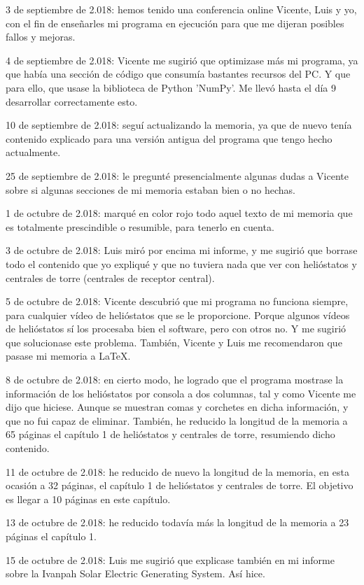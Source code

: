 \documentclass[12pt]{article}
\begin{document}
3 de septiembre de 2.018: hemos tenido una conferencia online Vicente, Luis y yo, con el fin de enseñarles mi programa en ejecución para que me dijeran posibles fallos y mejoras.

4 de septiembre de 2.018: Vicente me sugirió que optimizase más mi programa, ya que había una sección de código que consumía bastantes recursos del PC. Y que para ello, que usase la biblioteca de Python 'NumPy'. Me llevó hasta el día 9 desarrollar correctamente esto.

10 de septiembre de 2.018: seguí actualizando la memoria, ya que de nuevo tenía contenido explicado para una versión antigua del programa que tengo hecho actualmente.

25 de septiembre de 2.018: le pregunté presencialmente algunas dudas a Vicente sobre si algunas secciones de mi memoria estaban bien o no hechas.

1 de octubre de 2.018: marqué en color rojo todo aquel texto de mi memoria que es totalmente prescindible o resumible, para tenerlo en cuenta.

3 de octubre de 2.018: Luis miró por encima mi informe, y me sugirió que borrase todo el contenido que yo expliqué y que no tuviera nada que ver con helióstatos y centrales de torre (centrales de receptor central).

5 de octubre de 2.018: Vicente descubrió que mi programa no funciona siempre, para cualquier vídeo de helióstatos que se le proporcione. Porque algunos vídeos de helióstatos sí los procesaba bien el software, pero con otros no. Y me sugirió que solucionase este problema. También, Vicente y Luis me recomendaron que pasase mi memoria a LaTeX.

8 de octubre de 2.018: en cierto modo, he logrado que el programa mostrase la información de los helióstatos por consola a dos columnas, tal y como Vicente me dijo que hiciese. Aunque se muestran comas y corchetes en dicha información, y que no fui capaz de eliminar. También, he reducido la longitud de la memoria a 65 páginas el capítulo 1 de helióstatos y centrales de torre, resumiendo dicho contenido.

11 de octubre de 2.018: he reducido de nuevo la longitud de la memoria, en esta ocasión a 32 páginas, el capítulo 1 de helióstatos y centrales de torre. El objetivo es llegar a 10 páginas en este capítulo.

13 de octubre de 2.018: he reducido todavía más la longitud de la memoria a 23 páginas el capítulo 1.

15 de octubre de 2.018: Luis me sugirió que explicase también en mi informe sobre la Ivanpah Solar Electric Generating System. Así hice.
\end{document}
